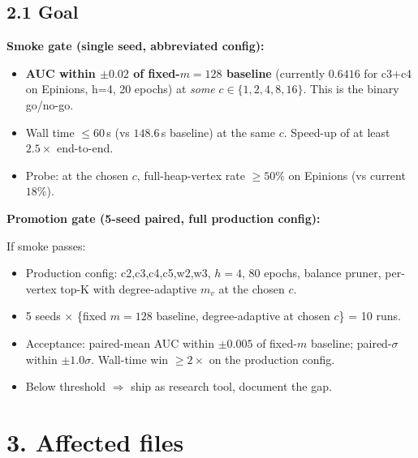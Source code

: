 \documentclass[a4paper,11pt]{article}
\begin{document}
\subsection*{2.1 Goal}

\textbf{Smoke gate (single seed, abbreviated config):}
\begin{itemize}
  \item \textbf{AUC within $\pm 0.02$ of fixed-$m{=}128$ baseline}
    (currently $0.6416$ for c3+c4 on Epinions, h=4, 20 epochs) at
    \emph{some} $c \in \{1, 2, 4, 8, 16\}$.  This is the binary
    go/no-go.
  \item Wall time $\le 60$\,s (vs $148.6$\,s baseline) at the
    same $c$.  Speed-up of at least $2.5\times$ end-to-end.
  \item Probe: at the chosen $c$, full-heap-vertex rate $\ge 50\%$
    on Epinions (vs current $18\%$).
\end{itemize}

\textbf{Promotion gate (5-seed paired, full production config):}

If smoke passes:

\begin{itemize}
  \item Production config: c2,c3,c4,c5,w2,w3, $h{=}4$, 80 epochs,
    balance pruner, per-vertex top-K with degree-adaptive $m_v$ at
    the chosen $c$.
  \item 5 seeds × \{fixed $m{=}128$ baseline, degree-adaptive at
    chosen $c$\} = 10 runs.
  \item Acceptance: paired-mean AUC within $\pm 0.005$ of fixed-$m$
    baseline; paired-$\sigma$ within $\pm 1.0\sigma$.  Wall-time win
    $\ge 2\times$ on the production config.
  \item Below threshold $\Rightarrow$ ship as research tool, document
    the gap.
\end{itemize}

\section*{3. Affected files}
\end{document}
